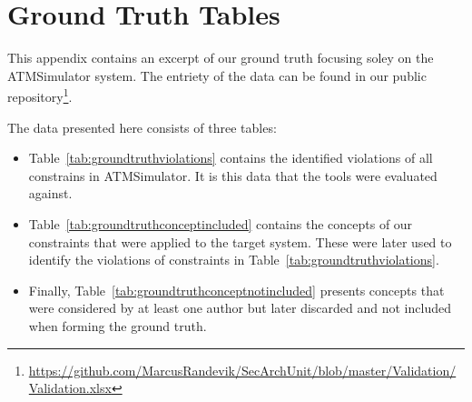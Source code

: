 \chapter{Ground Truth Tables}\label{chap:groundtruth}

This appendix contains an excerpt of our ground truth focusing soley on the ATMSimulator system. The entriety of the data can be found in our public repository\footnote{\url{https://github.com/MarcusRandevik/SecArchUnit/blob/master/Validation/Validation.xlsx}}. 

The data presented here consists of three tables:

\begin{itemize}
    \item Table~\ref{tab:groundtruthviolations} contains the identified violations of all constrains in ATMSimulator. It is this data that the tools were evaluated against.
    \item Table~\ref{tab:groundtruthconceptincluded} contains the concepts of our constraints that were applied to the target system. These were later used to identify the violations of constraints in Table~\ref{tab:groundtruthviolations}.
    \item Finally, Table~\ref{tab:groundtruthconceptnotincluded} presents concepts that were considered by at least one author but later discarded and not included when forming the ground truth. 
\end{itemize}  

